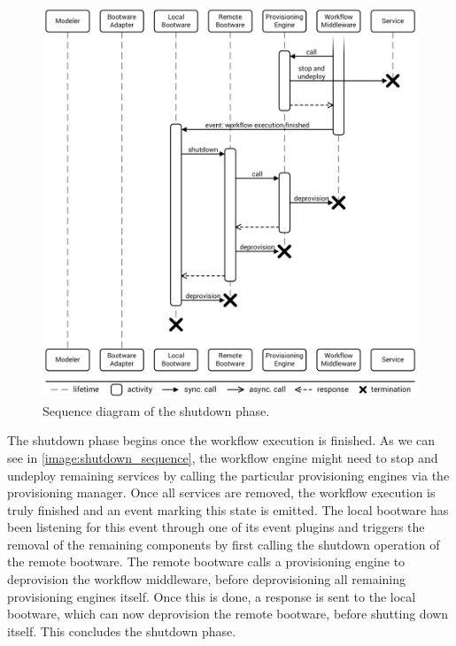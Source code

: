 \begin{figure}[!htbp]
	\centering
	\includegraphics[resolution=600]{process/assets/shutdown_sequence}
	\caption{Sequence diagram of the shutdown phase.}
	\label{image:shutdown_sequence}
\end{figure}

The shutdown phase begins once the workflow execution is finished.
As we can see in \autoref{image:shutdown_sequence}, the workflow engine might need to stop and undeploy remaining services by calling the particular provisioning engines via the provisioning manager.
Once all services are removed, the workflow execution is truly finished and an event marking this state is emitted.
The local bootware has been listening for this event through one of its event plugins and triggers the removal of the remaining components by first calling the shutdown operation of the remote bootware.
The remote bootware calls a provisioning engine to deprovision the workflow middleware, before deprovisioning all remaining provisioning engines itself.
Once this is done, a response is sent to the local bootware, which can now deprovision the remote bootware, before shutting down itself.
This concludes the shutdown phase.
